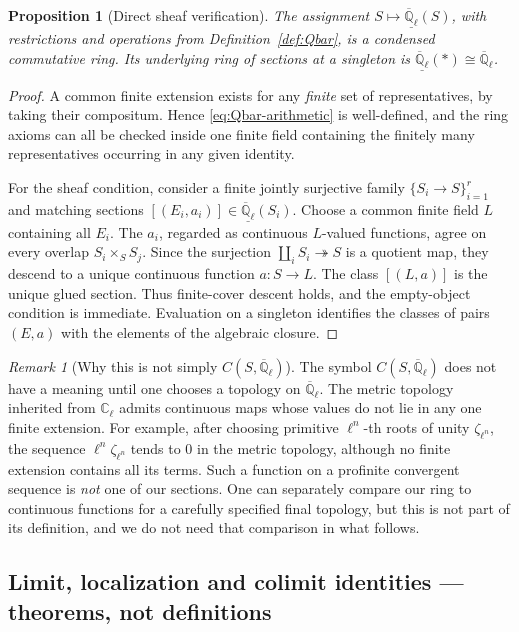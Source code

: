 \documentclass[11pt,a4paper]{article}
\numberwithin{equation}{section}
\newtheorem{proposition}[theorem]{Proposition}
\theoremstyle{definition}
\theoremstyle{remark}
\newtheorem{remark}[theorem]{Remark}
\newcommand{\ringunder}[1]{\underline{#1}}
\newcommand{\Qlbar}{\overline{\mathbb Q}_{\ell}}
\begin{document}
\begin{proposition}[Direct sheaf verification]\label{prop:Qbar-sheaf}
The assignment $S\mapsto\ringunder{\Qlbar}(S)$, with restrictions
and operations from Definition~\ref{def:Qbar}, is a condensed
commutative ring.  Its underlying ring of sections at a singleton is
$\ringunder{\Qlbar}(*)\cong\Qlbar$.
\end{proposition}
\begin{proof}
A common finite extension exists for any \emph{finite} set of
representatives, by taking their compositum.  Hence
\eqref{eq:Qbar-arithmetic} is well-defined, and the ring axioms can
all be checked inside one finite field containing the finitely many
representatives occurring in any given identity.

For the sheaf condition, consider a finite jointly surjective family
$\{S_i\to S\}_{i=1}^r$ and matching sections
$[(E_i,a_i)]\in\ringunder{\Qlbar}(S_i)$.  Choose a common finite
field $L$ containing all $E_i$.  The $a_i$, regarded as continuous
$L$-valued functions, agree on every overlap
$S_i\times_S S_j$.  Since the surjection
$\coprod_iS_i\twoheadrightarrow S$ is a quotient map, they descend
to a unique continuous function $a:S\to L$.  The class $[(L,a)]$
is the unique glued section.  Thus finite-cover descent holds, and
the empty-object condition is immediate.  Evaluation on a singleton
identifies the classes of pairs $(E,a)$ with the elements of the
algebraic closure.
\end{proof}

\begin{remark}[Why this is not simply $C(S,\Qlbar)$]
The symbol $C(S,\Qlbar)$ does not have a meaning until one chooses a
topology on $\Qlbar$.  The metric topology inherited from
$\mathbb C_\ell$ admits continuous maps whose values do not lie in
any one finite extension.  For example, after choosing primitive
$\ell^n$-th roots of unity $\zeta_{\ell^n}$, the sequence
$\ell^n\zeta_{\ell^n}$ tends to $0$ in the metric topology, although
no finite extension contains all its terms.  Such a function on a
profinite convergent sequence is \emph{not} one of our sections.
One can separately compare our ring to continuous functions for a
carefully specified final topology, but this is not part of its
definition, and we do not need that comparison in what follows.
\end{remark}

\subsection{Limit, localization and colimit identities --- theorems, not definitions}
\end{document}

